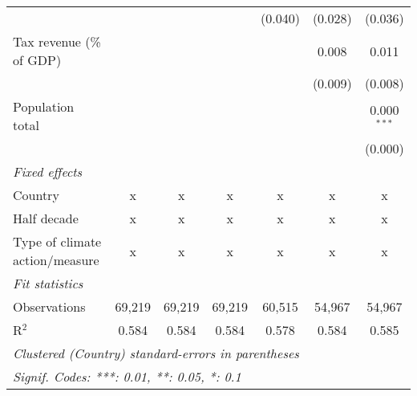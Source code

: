 \begin{tabular}{lcccccc}
                                                   &         &                &                & (0.040)        & (0.028)        & (0.036)\\   
   Tax revenue (\% of GDP)                         &         &                &                &                & 0.008          & 0.011\\   
                                                   &         &                &                &                & (0.009)        & (0.008)\\   
   Population total                                &         &                &                &                &                & 0.000$^{***}$\\   
                                                   &         &                &                &                &                & (0.000)\\   
   \emph{Fixed effects}\\
   Country                                         & x       & x              & x              & x              & x              & x\\  
   Half decade                                     & x       & x              & x              & x              & x              & x\\  
   Type of climate action/measure                  & x       & x              & x              & x              & x              & x\\  
   \midrule \emph{Fit statistics}\\
   Observations                                    & 69,219  & 69,219         & 69,219         & 60,515         & 54,967         & 54,967\\  
   R$^2$                                           & 0.584   & 0.584          & 0.584          & 0.578          & 0.584          & 0.585\\  
   \midrule
   \multicolumn{7}{l}{\emph{Clustered (Country) standard-errors in parentheses}}\\
   \multicolumn{7}{l}{\emph{Signif. Codes: ***: 0.01, **: 0.05, *: 0.1}}\\
\end{tabular}
\par\endgroup


